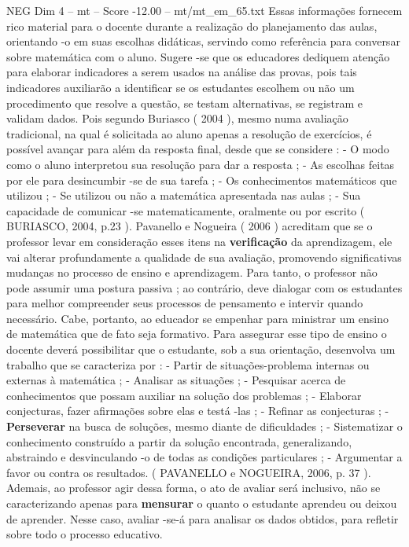 \begin{textsample}{NEG Dim 4 – mt – Score -12.00 – mt/mt\_em\_65.txt}
Essas informações fornecem rico material para o docente durante a realização do planejamento das aulas, orientando -o em suas escolhas didáticas, servindo como referência para conversar sobre matemática com o aluno.
Sugere -se que os educadores dediquem atenção para elaborar indicadores a serem usados na análise das provas, pois tais indicadores auxiliarão a identificar se os estudantes escolhem ou não um procedimento que resolve a questão, se testam alternativas, se registram e validam dados.
Pois segundo Buriasco ( 2004 ), mesmo numa avaliação tradicional, na qual é solicitada ao aluno apenas a resolução de exercícios, é possível avançar para além da resposta final, desde que se considere : - O modo como o aluno interpretou sua resolução para dar a resposta ; - As escolhas feitas por ele para desincumbir -se de sua tarefa ; - Os conhecimentos matemáticos que utilizou ; - Se utilizou ou não a matemática apresentada nas aulas ; - Sua capacidade de comunicar -se matematicamente, oralmente ou por escrito ( BURIASCO, 2004, p.23 ).
Pavanello e Nogueira ( 2006 ) acreditam que se o professor levar em consideração esses itens na \textbf{verificação} da aprendizagem, ele vai alterar profundamente a qualidade de sua avaliação, promovendo significativas mudanças no processo de ensino e aprendizagem.
Para tanto, o professor não pode assumir uma postura passiva ; ao contrário, deve dialogar com os estudantes para melhor compreender seus processos de pensamento e intervir quando necessário.
Cabe, portanto, ao educador se empenhar para ministrar um ensino de matemática que de fato seja formativo.
Para assegurar esse tipo de ensino o docente deverá possibilitar que o estudante, sob a sua orientação, desenvolva um trabalho que se caracteriza por : - Partir de situações-problema internas ou externas à matemática ; - Analisar as situações ; - Pesquisar acerca de conhecimentos que possam auxiliar na solução dos problemas ; - Elaborar conjecturas, fazer afirmações sobre elas e testá -las ; - Refinar as conjecturas ; - \textbf{Perseverar} na busca de soluções, mesmo diante de dificuldades ; - Sistematizar o conhecimento construído a partir da solução encontrada, generalizando, abstraindo e desvinculando -o de todas as condições particulares ; - Argumentar a favor ou contra os resultados. ( PAVANELLO e NOGUEIRA, 2006, p. 37 ).
Ademais, ao professor agir dessa forma, o ato de avaliar será inclusivo, não se caracterizando apenas para \textbf{mensurar} o quanto o estudante aprendeu ou deixou de aprender.
Nesse caso, avaliar -se-á para analisar os dados obtidos, para refletir sobre todo o processo educativo.

\end{textsample}
